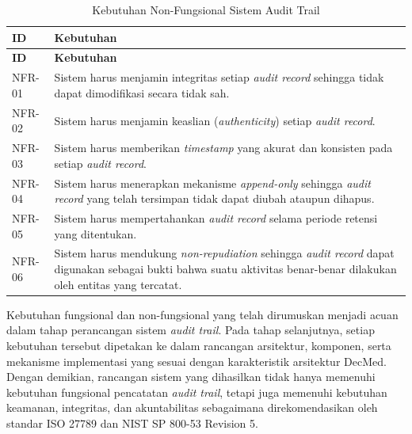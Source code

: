 \begin{xltabular}{\textwidth}{|p{2cm}|X|}
\caption{Kebutuhan Non-Fungsional Sistem Audit Trail}
\label{tab:kebutuhan_non_fungsional}\\

\hline
\textbf{ID} & \textbf{Kebutuhan}\\
\hline
\endfirsthead

\hline
\textbf{ID} & \textbf{Kebutuhan}\\
\hline
\endhead

\hline
\endfoot

NFR-01 &
Sistem harus menjamin integritas setiap \textit{audit record} sehingga tidak dapat dimodifikasi secara tidak sah.\\
\hline

NFR-02 &
Sistem harus menjamin keaslian (\textit{authenticity}) setiap \textit{audit record}.\\
\hline

NFR-03 &
Sistem harus memberikan \textit{timestamp} yang akurat dan konsisten pada setiap \textit{audit record}.\\
\hline

NFR-04 &
Sistem harus menerapkan mekanisme \textit{append-only} sehingga \textit{audit record} yang telah tersimpan tidak dapat diubah ataupun dihapus.\\
\hline

NFR-05 &
Sistem harus mempertahankan \textit{audit record} selama periode retensi yang ditentukan.\\
\hline

NFR-06 &
Sistem harus mendukung \textit{non-repudiation} sehingga \textit{audit record} dapat digunakan sebagai bukti bahwa suatu aktivitas benar-benar dilakukan oleh entitas yang tercatat. \\ 
\hline

\end{xltabular}

Kebutuhan fungsional dan non-fungsional yang telah dirumuskan menjadi acuan dalam tahap perancangan sistem \textit{audit trail}. Pada tahap selanjutnya, setiap kebutuhan tersebut dipetakan ke dalam rancangan arsitektur, komponen, serta mekanisme implementasi yang sesuai dengan karakteristik arsitektur DecMed. Dengan demikian, rancangan sistem yang dihasilkan tidak hanya memenuhi kebutuhan fungsional pencatatan \textit{audit trail}, tetapi juga memenuhi kebutuhan keamanan, integritas, dan akuntabilitas sebagaimana direkomendasikan oleh standar ISO 27789 dan NIST SP 800-53 Revision 5.